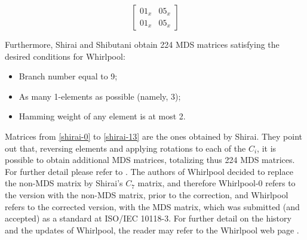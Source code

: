 \begin{equation}\label{mat:singular-whirlpool}
\begin{bmatrix}
  01_x & 05_x\\
  01_x & 05_x
\end{bmatrix}
\end{equation}

Furthermore, Shirai and Shibutani obtain 224 MDS matrices satisfying the desired conditions for Whirlpool:
\begin{itemize}
  \item Branch number equal to 9;
  \item As many 1-elements as possible (namely, 3);
  \item Hamming weight of any element is at most 2.
\end{itemize}

Matrices from \eqref{shirai-0} to \eqref{shirai-13} are the ones obtained by Shirai. They point out that, reversing elements and applying rotations to each of the $C_i$, it is possible to obtain additional MDS matrices, totalizing thus 224 MDS matrices. For further detail please refer to \cite{Shirai2003}. The authors of Whirlpool decided to replace the non-MDS matrix by Shirai's $C_7$ matrix, and therefore Whirlpool-0 refers to the version with the non-MDS matrix, prior to the correction, and Whirlpool refers to the corrected version, with the MDS matrix, which was submitted (and accepted) as a standard at ISO/IEC 10118-3. For further detail on the history and the updates of Whirlpool, the reader may refer to the Whirlpool web page \cite{WhirlpoolWebPage}.

